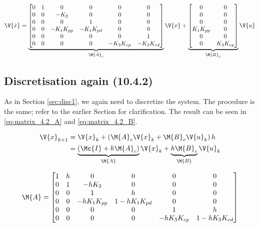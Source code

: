 \begin{equation}\label{eq:matrices}
	\V{\dot{x}} =
	\underbrace{
		\begin{bmatrix}
			0 & 1 & 0				& 0				& 0				& 0				\\
			0 & 0 & -K_{2}			& 0				& 0				& 0				\\
			0 & 0 & 0				& 1				& 0				& 0				\\
			0 & 0 & -K_{1}K_{pp}	& -K_{1}K_{pd}	& 0				& 0				\\
			0 & 0 & 0				& 0 			& 0				& 1				\\
			0 & 0 & 0				& 0				& -K_{3}K_{ep}	& -K_{3}K_{ed}	\\
		\end{bmatrix}
	}_{\M{A}_{c}}
	\V{x} +
	\underbrace{
		\begin{bmatrix}
			0			& 0				\\
			0			& 0				\\
			0			& 0				\\
			K_{1}K_{pp}	& 0				\\
			0			& 0				\\
			0			& K_{3}K_{ep}	\\
		\end{bmatrix}
	}_{\M{B}_{c}}
	\V{u}
\end{equation}

\subsection{Discretisation again (10.4.2)}
As in Section \ref{sec:disc1}, we again need to discretize the system. The procedure is the same; refer to the earlier Section for clarification. The result can be seen in \eqref{eq:matrix_4.2_A} and \eqref{eq:matrix_4.2_B}.

\begin{equation}
\begin{aligned}
	\V{x}_{k+1}	&= \V{x}_{k} + \left( \M{A}_{c} \V{x}_{k} + \M{B}_{c} \V{u}_{k} \right) h \\
				&= \underbrace{\left( \Mc{I} + h \M{A}_{c} \right)}_{\M{A}} \V{x}_{k}
				+ \underbrace{h \M{B}_{c}}_{\M{B}} \V{u}_{k} \\
\end{aligned}
\end{equation}

\begin{equation}\label{eq:matrix_4.2_A}
	\M{A} =
	\begin{bmatrix}
		1 & h & 0				& 0					& 0				& 0					\\
		0 & 1 & -hK_{2}			& 0					& 0				& 0					\\
		0 & 0 & 1				& h					& 0				& 0					\\
		0 & 0 & -hK_{1}K_{pp}	& 1-hK_{1}K_{pd}	& 0				& 0					\\
		0 & 0 & 0				& 0					& 1				& h					\\
		0 & 0 & 0				& 0					& -hK_{3}K_{ep}	& 1-hK_{3}K_{ed}	\\
	\end{bmatrix}
\end{equation}

